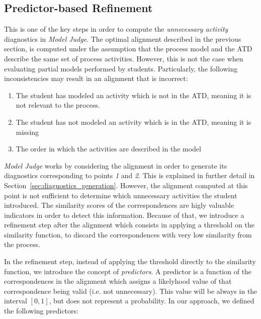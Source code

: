 \subsection{Predictor-based Refinement}

This is one of the key steps in order to compute the \emph{unnecessary activity}
diagnostics in \emph{Model Judge}. The optimal alignment described in the
previous section, is computed under the assumption that the process model and
the ATD describe the same set of process activities. However, this is not the
case when evaluating partial models performed by students. Particularly, the
following inconsistencies may result in an alignment that is incorrect:

\begin{enumerate}
  \item The student has modeled an activity which is not in the ATD, meaning it
    is not relevant to the process.
  \item The student has not modeled an activity which is in the ATD, meaning it
    is missing 
  \item The order in which the activities are described in the model 
\end{enumerate}

\emph{Model Judge} works by considering the alignment in order to generate
its diagnostics corresponding to points \emph{1} and \emph{2}. This is explained
in further detail in Section~\ref{sec:diagnostics_generation}. However, the
alignment computed at this point is not sufficient to determine which
unnecessary activities the student introduced. The similarity scores of the
correspondences are higly valuable indicators in order to detect this
information. Because of that, we introduce a refinement step after the alignment
which consists in applying a threshold on the similarity function, to discard
the correspondences with very low similarity from the process.

In the refinement step, instead of applying the threshold directly to the
similarity function, we introduce the concept of \emph{predictors}. A predictor
is a function of the correspondences in the alignment which assigns a likelyhood
value of that correspondence being valid (i.e. not unnecessary). This value will
be always in the interval $[0,1]$, but does not represent a probability. In our
approach, we defined the following predictors:

